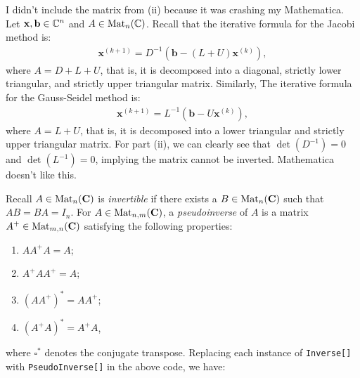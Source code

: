 \documentclass[12pt,twoside,openany]{memoir}
\begin{document}
\vspace{10pt}
\noindent I didn't include the matrix from (ii) because it was crashing my Mathematica. Let $\mathbf{x},\mathbf{b} \in \mathbb{C}^n$ and $A \in \operatorname{Mat}_{n}(\mathbb{C})$. Recall that the iterative formula for the Jacobi method is:
    \begin{equation*}
    \begin{split}
        \mathbf{x}^{(k+1)} = D^{-1} \left( \mathbf{b} - (L + U)\mathbf{x}^{(k)} \right),
    \end{split}
    \end{equation*}
where $A = D + L + U$, that is, it is decomposed into a diagonal, strictly lower triangular, and strictly upper triangular matrix. Similarly, The iterative formula for the Gauss-Seidel method is:
    \begin{equation*}
    \begin{split}
        \mathbf{x}^{(k+1)} = L^{-1}(\mathbf{b} - U \mathbf{x}^{(k)}),
    \end{split}
    \end{equation*}
where $A = L + U$, that is, it is decomposed into a lower triangular and strictly upper triangular matrix. For part (ii), we can clearly see that $\det(D^{-1}) = 0$ and $\det(L^{-1}) = 0$, implying the matrix cannot be inverted. Mathematica doesn't like this.

Recall $A \in \operatorname{Mat}_{n}(\mathbf{C})$ is \textit{invertible} if there exists a $B \in \operatorname{Mat}_{n}(\mathbf{C})$ such that $AB = BA = I_n$. For $A \in \operatorname{Mat}_{n,m}(\mathbf{C})$, a \textit{pseudoinverse} of $A$ is a matrix $A^+ \in \operatorname{Mat}_{m,n}(\mathbf{C})$ satisfying the following properties:
    \begin{enumerate}[label = (\arabic*),itemsep=1pt,topsep=3pt]
        \item $A A^+ A = A$;
        \item $A^+ A A^+ = A$;
        \item $(A A^+)^\ast = A A^+$;
        \item $(A^+ A)^\ast = A^+ A$,
    \end{enumerate}
where $\square^\ast$ denotes the conjugate transpose. Replacing each instance of \texttt{Inverse[]} with \texttt{PseudoInverse[]} in the above code, we have:
\newpage
\end{document}
